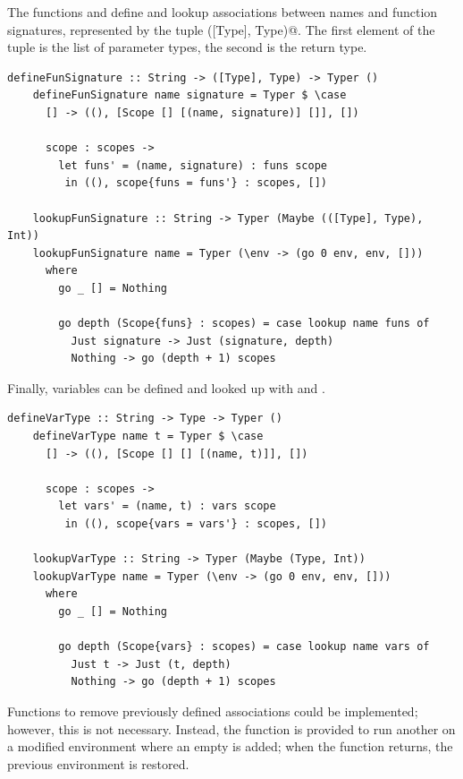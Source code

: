 \documentclass[UdineBachThesis,american,11pt]{PhdThesis}
\begin{document}
  The functions \lstinline@defineFunSignature@ and
  \lstinline@lookupFunSignature@ define and lookup associations between names
  and function signatures, represented by the tuple \lstinline@([Type], Type)@.
  The first element of the tuple is the list of parameter types, the second is
  the return type.

  \begin{lstlisting}[gobble=4,basicstyle=\ttfamily\small]
    defineFunSignature :: String -> ([Type], Type) -> Typer ()
    defineFunSignature name signature = Typer $ \case
      [] -> ((), [Scope [] [(name, signature)] []], [])

      scope : scopes ->
        let funs' = (name, signature) : funs scope
         in ((), scope{funs = funs'} : scopes, [])

    lookupFunSignature :: String -> Typer (Maybe (([Type], Type), Int))
    lookupFunSignature name = Typer (\env -> (go 0 env, env, []))
      where
        go _ [] = Nothing

        go depth (Scope{funs} : scopes) = case lookup name funs of
          Just signature -> Just (signature, depth)
          Nothing -> go (depth + 1) scopes
  \end{lstlisting}

  \newpage

  Finally, variables can be defined and looked up with \lstinline@defineVarType@
  and \lstinline@lookupVarType@.

  \begin{lstlisting}[gobble=4,basicstyle=\ttfamily\small]
    defineVarType :: String -> Type -> Typer ()
    defineVarType name t = Typer $ \case
      [] -> ((), [Scope [] [] [(name, t)]], [])

      scope : scopes ->
        let vars' = (name, t) : vars scope
         in ((), scope{vars = vars'} : scopes, [])

    lookupVarType :: String -> Typer (Maybe (Type, Int))
    lookupVarType name = Typer (\env -> (go 0 env, env, []))
      where
        go _ [] = Nothing

        go depth (Scope{vars} : scopes) = case lookup name vars of
          Just t -> Just (t, depth)
          Nothing -> go (depth + 1) scopes
  \end{lstlisting}

  Functions to remove previously defined associations could be implemented;
  however, this is not necessary. Instead, the function \lstinline@withNewScope@
  is provided to run another \lstinline@Typer@ on a modified environment where
  an empty \lstinline@Scope@ is added; when the function returns, the previous
  environment is restored.
\end{document}
